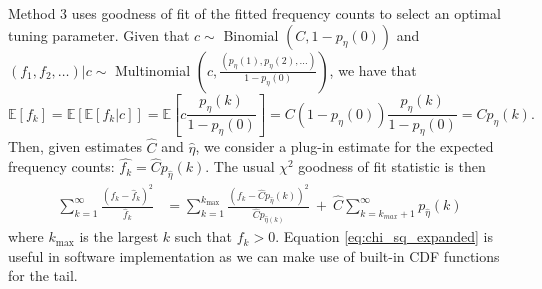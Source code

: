 \documentclass[oupdraft]{bio}
\newcommand{\kmax}{k_{\text{max}}}
\begin{document}
Method 3 uses goodness of fit of the fitted frequency counts to select an optimal tuning parameter.
Given that $c \sim$ Binomial $\left(C, 1- p_{\eta}(0)\right)$ and $(f_1, f_2, \ldots)|c \sim$  Multinomial $\left(c,  \frac{(p_{\eta}(1), p_{\eta}(2), \ldots)}{1-p_{\eta}(0)}\right)$, we have that
\begin{equation}
 \mathbb{E}\left[f_k\right] = \mathbb{E}\left[\mathbb{E}\left[f_k|c \right]\right] = \mathbb{E}\left[ c \frac{p_{\eta}(k)}{1-p_{\eta}(0)} \right] = C\left(1-p_{\eta}(0) \right) \frac{p_{\eta}(k)}{1-p_{\eta}(0)} = Cp_{\eta}(k).
\end{equation}
Then, given estimates $\widehat{C}$ and $\widehat{\eta}$, we consider a plug-in estimate for the expected frequency counts: $\widehat{f_k} = \widehat{C}p_{\widehat{\eta}}(k)$.  The usual $\chi^2$ goodness of fit statistic is then
\begin{align}
\sum_{k=1}^{\infty} \frac{\left(f_k - \widehat{f}_k \right)^2 }{\widehat{f}_k} %
&= \sum_{k=1}^{\kmax} \frac{\left(f_k - \widehat{C}p_{\widehat{\eta}}(k) \right)^2 }{\widehat{C} p_{\widehat{\eta}(k)}} \ + \ \widehat{C} \sum_{k = k_{max}+1}^{\infty} p_{\widehat{\eta}}(k)
\label{eq:chi_sq_expanded}
\end{align}
where $\kmax$ is the largest $k$ such that $f_k > 0$.
Equation \eqref{eq:chi_sq_expanded} is useful in software implementation as we can make use of built-in CDF functions for the tail.

\end{document}
